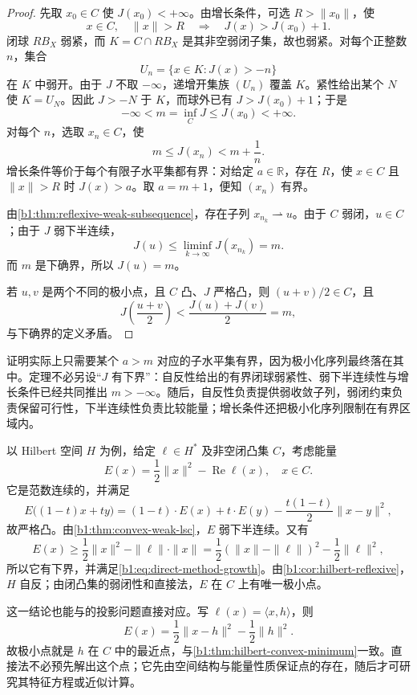 \begin{proof}
先取 \(x_0\in C\) 使 \(J(x_0)<+\infty\)。由增长条件，可选 \(R>\|x_0\|\)，使
\[
 x\in C,\quad \|x\|>R
 \quad\Longrightarrow\quad J(x)>J(x_0)+1.
\]
闭球 \(RB_X\) 弱紧，而 \(K=C\cap RB_X\) 是其非空弱闭子集，故也弱紧。对每个正整数 \(n\)，集合
\[
 U_n=\{x\in K:J(x)>-n\}
\]
在 \(K\) 中弱开。由于 \(J\) 不取 \(-\infty\)，递增开集族 \((U_n)\) 覆盖 \(K\)。紧性给出某个 \(N\) 使 \(K=U_N\)。因此 \(J>-N\) 于 \(K\)，而球外已有 \(J>J(x_0)+1\)；于是
\[
 -\infty<m=\inf_CJ\leq J(x_0)<+\infty.
\]
对每个 \(n\)，选取 \(x_n\in C\)，使
\[
  m\leq J(x_n)<m+\frac1n.
\]
增长条件等价于每个有限子水平集都有界：对给定 \(a\in\mathbb R\)，存在 \(R\)，使 \(x\in C\) 且 \(\|x\|>R\) 时 \(J(x)>a\)。取 \(a=m+1\)，便知 \((x_n)\) 有界。

由\cref{b1:thm:reflexive-weak-subsequence}，存在子列 \(x_{n_k}\rightharpoonup u\)。由于 \(C\) 弱闭，\(u\in C\)；由于 \(J\) 弱下半连续，
\[
  J(u)\leq\liminf_{k\to\infty}J(x_{n_k})=m.
\]
而 \(m\) 是下确界，所以 \(J(u)=m\)。

若 \(u,v\) 是两个不同的极小点，且 \(C\) 凸、\(J\) 严格凸，则 \((u+v)/2\in C\)，且
\[
  J\left(\frac{u+v}{2}\right)
  <\frac{J(u)+J(v)}2=m,
\]
与下确界的定义矛盾。
\end{proof}

证明实际上只需要某个 \(a>m\) 对应的子水平集有界，因为极小化序列最终落在其中。定理不必另设“\(J\) 有下界”：自反性给出的有界闭球弱紧性、弱下半连续性与增长条件已经共同推出 \(m> -\infty\)。随后，自反性负责提供弱收敛子列，弱闭约束负责保留可行性，下半连续性负责比较能量；增长条件还把极小化序列限制在有界区域内。

\ProseParagraphBreak

以 Hilbert 空间 \(H\) 为例，给定 \(\ell\in H^*\) 及非空闭凸集 \(C\)，考虑能量
\[
  E(x)=\frac12\|x\|^2-\operatorname{Re}\ell(x),
  \quad x\in C.
\]
它是范数连续的，并满足
\[
  E\bigl((1-t)x+ty\bigr)
  =(1-t)\cdot E(x)+t\cdot E(y)-\frac{t(1-t)}2\|x-y\|^2,
\]
故严格凸。由\cref{b1:thm:convex-weak-lsc}，\(E\) 弱下半连续。又有
\[
  E(x)\geq\frac12\|x\|^2-\|\ell\|\cdot\|x\|
  =\frac12(\|x\|-\|\ell\|)^2-\frac12\|\ell\|^2,
\]
所以它有下界，并满足\eqref{b1:eq:direct-method-growth}。由\cref{b1:cor:hilbert-reflexive}，\(H\) 自反；由闭凸集的弱闭性和直接法，\(E\) 在 \(C\) 上有唯一极小点。

\ProseParagraphBreak

这一结论也能与的投影问题直接对应。写 \(\ell(x)=\langle x,h\rangle\)，则
\[
  E(x)=\frac12\|x-h\|^2-\frac12\|h\|^2.
\]
故极小点就是 \(h\) 在 \(C\) 中的最近点，与\cref{b1:thm:hilbert-convex-minimum}一致。直接法不必预先解出这个点；它先由空间结构与能量性质保证点的存在，随后才可研究其特征方程或近似计算。

